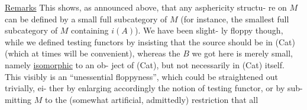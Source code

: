 \uline{Remarks} This shows, as announced above, that any asphericity structu-%
re on $M$ can be defined by a small full subcategory of $M$ (for instance,
the smallest full subcategory of $M$ containing $i(A)$). We have been slight-%
ly floppy though, while we defined testing functors  by insisting
that the source should be in (Cat) (which at times will be convenient),
whereas the $B$ we got here is merely small, namely \uline{isomorphic} to an ob-%
ject of (Cat), but not necessarily in (Cat) itself. This visibly is an
``unessential floppyness'', which could be straightened out trivially, ei-%
ther by enlarging accordingly the notion of testing functor, or by sub-%
mitting $M$ to the (somewhat artificial, admittedly) restriction that all

